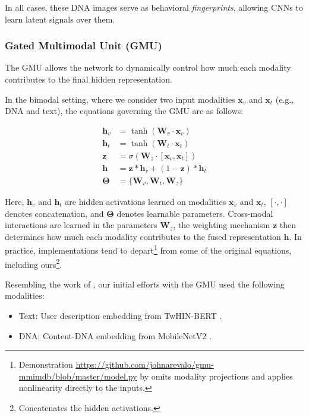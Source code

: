 \documentclass[conference]{IEEEtran}
\begin{document}
In all cases, these DNA images serve as behavioral \emph{fingerprints}, 
allowing CNNs to learn latent signals over them.

\subsubsection{\textbf{Gated Multimodal Unit (GMU)}}
The GMU allows the network to dynamically control how much 
each modality contributes to the final hidden representation.

In the bimodal setting, where we consider two 
input modalities \( \mathbf{x}_v \) 
and \( \mathbf{x}_t \) (e.g., DNA and text), 
the equations governing the GMU are as follows:

\begin{align}
\mathbf{h}_v &= \tanh(\mathbf{W}_v \cdot \mathbf{x}_v) \\
\mathbf{h}_t &= \tanh(\mathbf{W}_t \cdot \mathbf{x}_t) \\
\mathbf{z} &= \sigma(\mathbf{W}_z \cdot [\mathbf{x}_v, \mathbf{x}_t]) \\
\mathbf{h} &= \mathbf{z} * \mathbf{h}_v + (1 - \mathbf{z}) * \mathbf{h}_t \\
\mathbf{\Theta} &= \{ \mathbf{W}_v, \mathbf{W}_t, \mathbf{W}_z \} 
\end{align}


Here, \( \mathbf{h}_v \) and \( \mathbf{h}_t \) are hidden activations learned on modalities \( \mathbf{x}_v \) and \( \mathbf{x}_t \),
\([\mathbf{\cdot} , \mathbf{\cdot}] \) denotes concatenation, and \(\mathbf{\Theta} \) denotes learnable parameters.
Cross-modal interactions are learned in the parameters \( \mathbf{W}_z\), 
the weighting mechanism \(\mathbf{z} \)
then determines how much each modality contributes to the fused representation \(\mathbf{h} \).
In practice, implementations tend to depart\footnote{
    Demonstration \url{https://github.com/johnarevalo/gmu-mmimdb/blob/master/model.py}
    by \citet{arevalo2017gated} omits modality projections and applies nonlinearity directly to the inputs.}
from some of the original equations,
including ours\footnote{
    Concatenates
    the hidden activations.}.


Resembling the work of \citet{ilias2023multimodal}, 
our initial efforts with the GMU used the following modalities:
\begin{itemize}
    \item Text: User description embedding from TwHIN-BERT \citep{zhang2022twhin}.
    \item DNA: Content-DNA embedding from MobileNetV2 \citep{sandler2018mobilenetv2}.
\end{itemize}
\end{document}
